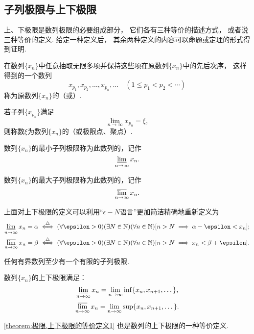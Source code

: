 \subsection{子列极限与上下极限}
上、下极限是数列极限的必要组成部分，
它们各有三种等价的描述方式，
或者说三种等价的定义.
给定一种定义后，
其余两种定义的内容可以命题或定理的形式得到证明.

\begin{definition}
在数列\(\{x_n\}\)中任意抽取无限多项并保持这些项在原数列\(\{x_n\}\)中的先后次序，
这样得到的一个数列\[
	x_{p_1},x_{p_2},\dotsc,x_{p_n},\dotsc
	\quad(1 \leq p_1 < p_2 < \dotsb)
\]
称为原数列\(\{x_n\}\)的（或）.
\end{definition}

\begin{definition}
若子列\(\{x_{p_n}\}\)满足\[
\lim_{n\to\infty} x_{p_n} = \xi,
\]则称数\(\xi\)为数列\(\{x_n\}\)的（或极限点、聚点）.

数列\(\{x_n\}\)的最小子列极限称为此数列的，记作\[
\varliminf_{n\to\infty} x_n.
\]

数列\(\{x_n\}\)的最大子列极限称为此数列的，记作\[
\varlimsup_{n\to\infty} x_n.
\]
\end{definition}
上面对上下极限的定义可以利用“\(\epsilon-N\)语言”更加简洁精确地重新定义为\begin{align*}
	\varliminf_{n\to\infty} x_n = \alpha
	&\defiff
	(\forall\epsilon>0)
	(\exists N\in\mathbb{N})
	(\forall n\in\mathbb{N})
	[
		n>N
		\implies
		\alpha-\epsilon < x_n
	]; \\
	\varlimsup_{n\to\infty} x_n = \beta
	&\defiff
	(\forall\epsilon>0)
	(\exists N\in\mathbb{N})
	(\forall n\in\mathbb{N})
	[
		n>N
		\implies
		x_n < \beta+\epsilon
	].
\end{align*}

\begin{theorem}\label{theorem:极限.波尔查诺--魏尔斯特拉斯原理}
任何有界数列至少有一个有限的子列极限.
\end{theorem}

\begin{theorem}\label{theorem:极限.上下极限的等价定义1}
数列\(\{x_n\}\)的上下极限满足：\[
	\varliminf_{n\to\infty} x_n
	= \lim_{n\to\infty} \inf\{x_n,x_{n+1},\dotsc\},
\]\[
	\varlimsup_{n\to\infty} x_n
	= \lim_{n\to\infty} \sup\{x_n,x_{n+1},\dotsc\}.
\]
\end{theorem}
\cref{theorem:极限.上下极限的等价定义1}
也是数列的上下极限的一种等价定义.

